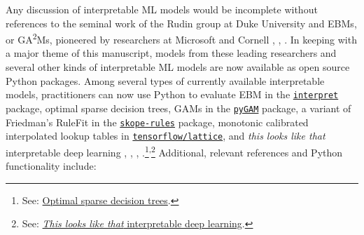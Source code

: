\documentclass[information,article,submit,moreauthors,pdftex]{definitions/mdpi}
\begin{document}
Any discussion of interpretable ML models would be incomplete without references to the seminal work of the Rudin group at Duke University  and EBMs, or GA\textsuperscript{2}Ms, pioneered by researchers at Microsoft and Cornell \cite{ga2m}, \cite{osdt}, \cite{this_looks_like_that}. In keeping with a major theme of this manuscript, models from these leading researchers and several other kinds of interpretable ML models are now available as open source Python packages. Among several types of currently available interpretable models, practitioners can now use Python to evaluate EBM in the \href{https://github.com/interpretml/interpret}{\texttt{interpret}} package, optimal sparse decision trees, GAMs in the \href{https://github.com/dswah/pyGAM}{\texttt{pyGAM}} package, a variant of Friedman's RuleFit  in the \href{https://github.com/scikit-learn-contrib/skope-rules}{\texttt{skope-rules}} package, monotonic calibrated interpolated lookup tables in \href{https://github.com/tensorflow/lattice}{\texttt{tensorflow/lattice}}, and \textit{this looks like that} interpretable deep learning \cite{osdt}, \cite{rulefit}, \cite{lattice}, \cite{this_looks_like_that}.\footnote{See: \href{https://github.com/xiyanghu/OSDT}{Optimal sparse decision trees}.}\textsuperscript{,}\footnote{See: \href{https://github.com/cfchen-duke/ProtoPNet}{\textit{This looks like that} interpretable deep learning}.} Additional, relevant references and Python functionality include:
\end{document}
